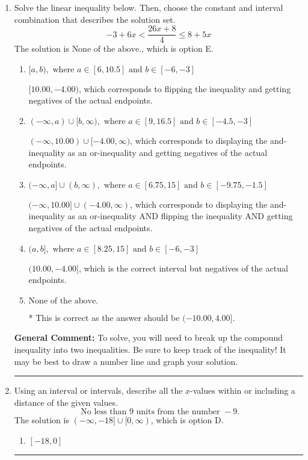 \documentclass{extbook}[14pt]
\newcommand{\litem}[1]{\item #1

\rule{\textwidth}{0.4pt}}
\begin{document}
\begin{enumerate}
{\begin{enumerate}[label=\Alph*.]
You may have chosen this if you thought the inequality did not match the ends of the intervals.
\end{enumerate}

\textbf{General Comment:} Remember that less/greater than or equal to includes the endpoint, while less/greater do not. Also, remember that you need to flip the inequality when you multiply or divide by a negative.
}
\litem{
Solve the linear inequality below. Then, choose the constant and interval combination that describes the solution set.
\[ -3 + 6 x < \frac{26 x + 8}{4} \leq 8 + 5 x \]The solution is \( \text{None of the above.} \), which is option E.\begin{enumerate}[label=\Alph*.]
\item \( [a, b), \text{ where } a \in [6, 10.5] \text{ and } b \in [-6, -3] \)

$[10.00, -4.00)$, which corresponds to flipping the inequality and getting negatives of the actual endpoints.
\item \( (-\infty, a) \cup [b, \infty), \text{ where } a \in [9, 16.5] \text{ and } b \in [-4.5, -3] \)

$(-\infty, 10.00) \cup [-4.00, \infty)$, which corresponds to displaying the and-inequality as an or-inequality and getting negatives of the actual endpoints.
\item \( (-\infty, a] \cup (b, \infty), \text{ where } a \in [6.75, 15] \text{ and } b \in [-9.75, -1.5] \)

$(-\infty, 10.00] \cup (-4.00, \infty)$, which corresponds to displaying the and-inequality as an or-inequality AND flipping the inequality AND getting negatives of the actual endpoints.
\item \( (a, b], \text{ where } a \in [8.25, 15] \text{ and } b \in [-6, -3] \)

$(10.00, -4.00]$, which is the correct interval but negatives of the actual endpoints.
\item \( \text{None of the above.} \)

* This is correct as the answer should be $(-10.00, 4.00]$.
\end{enumerate}

\textbf{General Comment:} To solve, you will need to break up the compound inequality into two inequalities. Be sure to keep track of the inequality! It may be best to draw a number line and graph your solution.
}
\litem{
Using an interval or intervals, describe all the $x$-values within or including a distance of the given values.
\[ \text{ No less than } 9 \text{ units from the number } -9. \]The solution is \( (-\infty, -18] \cup [0, \infty) \), which is option D.\begin{enumerate}[label=\Alph*.]
\item \( [-18, 0] \)


\end{enumerate}}
\end{enumerate}
\end{document}
